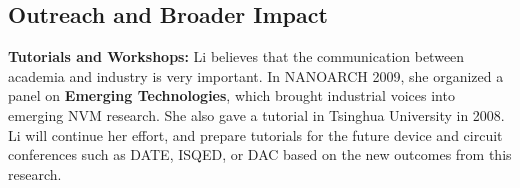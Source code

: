 


\vspace{10pt}
\subsection{Outreach and Broader Impact}

{\bf Tutorials and Workshops:} Li believes that the communication between academia and industry is very important. In NANOARCH 2009, she organized a panel on \textbf{Emerging Technologies}, which brought industrial voices into emerging NVM research. She also gave a tutorial in Tsinghua University in 2008. Li will continue her effort, and prepare tutorials for the future device and circuit conferences such as DATE, ISQED, or DAC based on the new outcomes from this research.  
